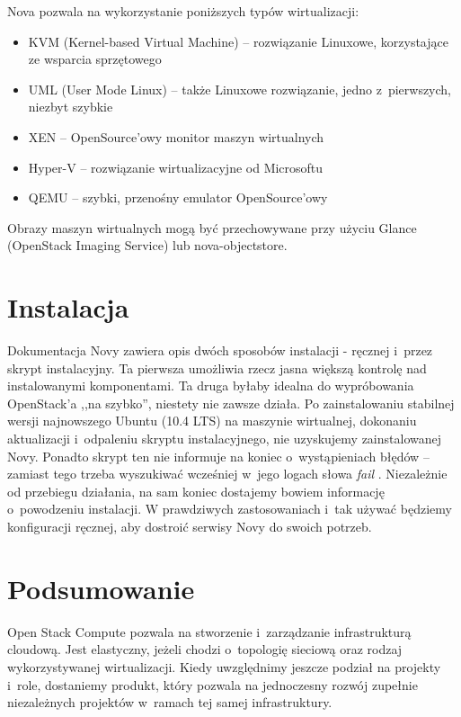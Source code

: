 Nova pozwala na wykorzystanie poniższych typów wirtualizacji\cite{nova_manual}:

\begin{itemize}
\item KVM (Kernel-based Virtual Machine) -- rozwiązanie Linuxowe, korzystające ze wsparcia sprzętowego
\item UML (User Mode Linux) -- także Linuxowe rozwiązanie, jedno z~pierwszych, niezbyt szybkie
\item XEN -- OpenSource'owy monitor maszyn wirtualnych
\item Hyper-V -- rozwiązanie wirtualizacyjne od Microsoftu
\item QEMU -- szybki, przenośny emulator OpenSource'owy
\end{itemize}

Obrazy maszyn wirtualnych mogą być przechowywane przy użyciu Glance (OpenStack Imaging Service) lub nova-objectstore.

\section{Instalacja}

Dokumentacja Novy zawiera opis dwóch sposobów instalacji - ręcznej i~przez skrypt instalacyjny\cite{nova_manual}. Ta pierwsza umożliwia rzecz jasna większą kontrolę nad instalowanymi komponentami. Ta druga byłaby idealna do wypróbowania OpenStack'a ,,na szybko'', niestety nie zawsze działa. Po zainstalowaniu stabilnej wersji najnowszego Ubuntu (10.4 LTS) na maszynie wirtualnej, dokonaniu aktualizacji i~odpaleniu skryptu instalacyjnego, nie uzyskujemy zainstalowanej Novy. Ponadto skrypt ten nie informuje na koniec o~wystąpieniach błędów -- zamiast tego trzeba wyszukiwać wcześniej w~jego logach słowa { \it fail }. Niezależnie od przebiegu działania, na sam koniec dostajemy bowiem informację o~powodzeniu instalacji.
W prawdziwych zastosowaniach i~tak używać będziemy konfiguracji ręcznej, aby dostroić serwisy Novy do swoich potrzeb.

\section{Podsumowanie}

Open Stack Compute pozwala na stworzenie i~zarządzanie infrastrukturą cloudową. Jest elastyczny, jeżeli chodzi o~topologię sieciową oraz rodzaj wykorzystywanej wirtualizacji. Kiedy uwzględnimy jeszcze podział na projekty i~role, dostaniemy produkt, który pozwala na jednoczesny rozwój zupełnie niezależnych projektów w~ramach tej samej infrastruktury.



	

